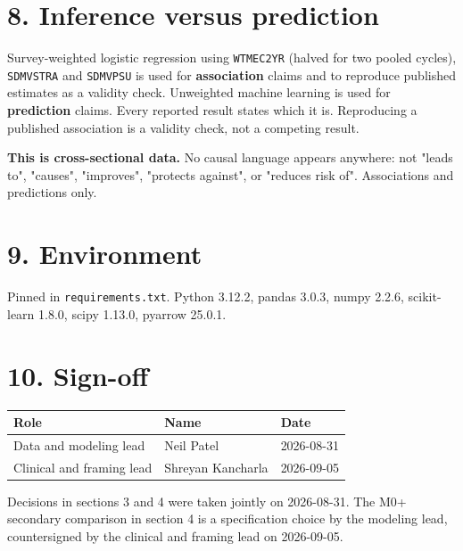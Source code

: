 \documentclass[11pt]{article}
\begin{document}
\section*{8. Inference versus prediction}

Survey-weighted logistic regression using \texttt{WTMEC2YR} (halved for two pooled cycles), \texttt{SDMVSTRA} and \texttt{SDMVPSU} is used for \textbf{association} claims and to reproduce published estimates as a validity check. Unweighted machine learning is used for \textbf{prediction} claims. Every reported result states which it is. Reproducing a published association is a validity check, not a competing result.

\textbf{This is cross-sectional data.} No causal language appears anywhere: not "leads to", "causes", "improves", "protects against", or "reduces risk of". Associations and predictions only.

\section*{9. Environment}

Pinned in \texttt{requirements.txt}. Python 3.12.2, pandas 3.0.3, numpy 2.2.6, scikit-learn 1.8.0, scipy 1.13.0, pyarrow 25.0.1.

\section*{10. Sign-off}

\begin{longtable}{L{5.5cm}L{4cm}L{3cm}}
\toprule
Role & Name & Date \\
\midrule
\endhead
Data and modeling lead & Neil Patel & 2026-08-31 \\
Clinical and framing lead & Shreyan Kancharla & 2026-09-05 \\
\bottomrule
\end{longtable}

Decisions in sections 3 and 4 were taken jointly on 2026-08-31. The M0+ secondary comparison in section 4 is a specification choice by the modeling lead, countersigned by the clinical and framing lead on 2026-09-05.
\end{document}
